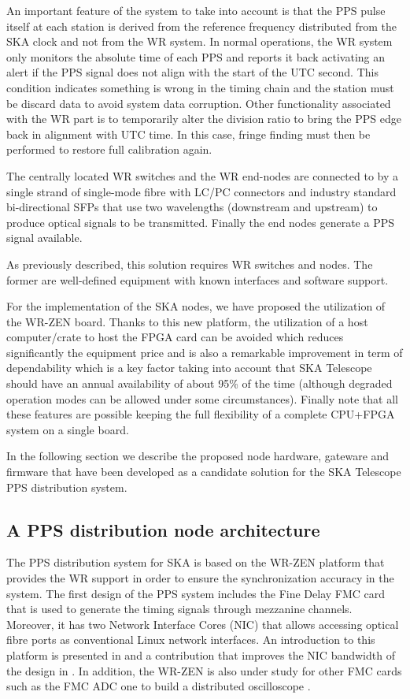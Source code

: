 An important feature of the system to take into account is that the PPS pulse itself at each station is derived from the reference frequency distributed from the SKA clock and not from the WR system. In normal operations, the WR system only monitors the absolute time of each PPS and reports it back activating an alert if the PPS signal does not align with the start of the UTC second. This condition indicates something is wrong in the timing chain and the station must be discard data to avoid system data corruption. Other functionality associated with the WR part is to temporarily alter the division ratio to bring the PPS edge back in alignment with UTC time. In this case, fringe finding must then be performed to restore full calibration again.

The centrally located WR switches and the WR end-nodes are connected to by a 
single strand of single-mode fibre with LC/PC connectors and industry standard 
bi-directional SFPs that use two wavelengths (downstream and upstream) to produce 
optical signals to be transmitted. Finally the end nodes generate a PPS signal available. 

As previously described, this solution requires WR switches and nodes. The former are well-defined equipment with known interfaces and software support. 

For the implementation of the SKA nodes, we have proposed the utilization of the WR-ZEN board. Thanks to this new platform, the utilization of a host computer/crate to host the FPGA card can be avoided which reduces significantly the equipment price and is also a remarkable improvement in term of dependability which is a key factor taking into account that SKA Telescope should have an annual availability of about 95\% of the time (although degraded operation modes can be allowed under some circumstances).
Finally note that all these features are possible keeping the full flexibility of a complete CPU+FPGA system on a single board. 

In the following section we describe the proposed node hardware, gateware and firmware that have been developed as a candidate solution for the SKA Telescope PPS distribution system. 

\subsection{A PPS distribution node architecture} \label{subsec:ska-pps-system-arch}

The PPS distribution system for SKA is based on the WR-ZEN platform that provides the WR support in order to ensure the synchronization accuracy in the system. The first design of the PPS system includes the Fine Delay FMC card that is used to generate the timing signals through mezzanine channels. Moreover, it has two Network Interface Cores (NIC) that allows accessing optical fibre ports as conventional Linux network interfaces. An introduction to this platform is presented in \cite{migueljl-paper-wr-zen-intro} and a contribution that improves the NIC bandwidth of the design in \cite{jorgesg-paper-wr-zen-dma}. In addition, the WR-ZEN is also under study for other FMC cards such as the FMC ADC one to build a distributed oscilloscope \cite{joselj-paper-wr-zen-adc}.

